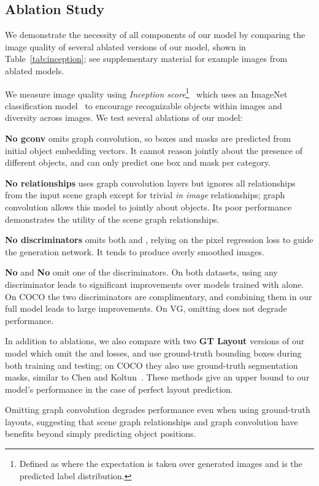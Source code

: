 \documentclass[10pt,twocolumn,letterpaper]{article}
\begin{document}
\subsection{Ablation Study}
We demonstrate the necessity of all components of our model by comparing the
image quality of several ablated versions of our model, shown in Table~\ref{tab:inception}; see supplementary material for example images from ablated models.

We measure image quality using \emph{Inception score}\footnote{Defined as  where the expectation is taken over generated images  and  is the predicted label distribution.}~\cite{salimans2016improved}
which uses an ImageNet classification model~\cite{russakovsky2015imagenet,szegedy2015going}
to encourage recognizable objects within images and diversity across images.
We test several ablations of our model:

\textbf{No gconv} omits graph convolution, so boxes and
masks are predicted from initial object embedding vectors.
It cannot reason jointly about the presence of different objects, and can only predict one box and mask per category.

\textbf{No relationships} uses graph convolution layers but ignores all
relationships from the input scene graph except for trivial \emph{in image}
relationships; graph convolution allows this model to jointly about
objects. Its poor performance demonstrates the utility of the scene graph relationships.

\textbf{No discriminators} omits both  and , relying on the
pixel regression loss  to guide the generation network.
It tends to produce overly smoothed images.

\textbf{No}  and \textbf{No}  omit one of
the discriminators. On both datasets, using any discriminator leads
to significant improvements over models trained with  alone.
On COCO the two discriminators are complimentary, and combining
them in our full model leads to large improvements.
On VG, omitting  does not degrade performance.

In addition to ablations, we also compare with two \textbf{GT Layout}
versions of our model which omit the  and  losses, and
use ground-truth bounding boxes during both training and testing; on COCO they
also use ground-truth segmentation masks, similar to Chen and
Koltun~\cite{chen2017photographic}. These methods give an upper bound to our
model's performance in the case of perfect layout prediction.

Omitting graph convolution degrades performance even when using ground-truth layouts, suggesting that scene graph relationships and graph convolution have benefits beyond simply predicting object positions.
\end{document}
